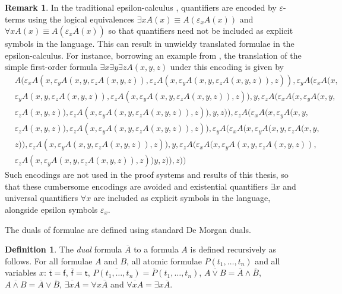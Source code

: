 \documentclass[10pt]{article}
\theoremstyle{definition}\newtheorem{remark}[theorem]{Remark}
\theoremstyle{definition}\newtheorem{example}[theorem]{Example}
\theoremstyle{definition}\newtheorem{definition}[theorem]{Definition}
\newcommand{\trueUnit}{\mathsf{t}}
\newcommand{\falseUnit}{\mathsf{f}}
\begin{document}
	\begin{remark}\label{EpsilonTranslationRemark}
		In the traditional epsilon-calculus \cite{HilbertFoundations, MoserEpsilonCalculus, MoserZachEpsilonCalculusAndHerbrand, BaazLolicEpsilonShorterProofs}, quantifiers are encoded by $\varepsilon$-terms using the logical equivalences $\exists x A(x) \equiv A(\varepsilon_x A(x))$ and $\forall x A(x) \equiv A(\varepsilon_x \overline{A}(x))$ so that quantifiers need not be included as explicit symbols in the language. This can result in unwieldy translated formulae in the epsilon-calculus. For instance, borrowing an example from \cite{BaazEpsilon}, the translation of the simple first-order formula $\exists x \exists y \exists z A(x, y, z)$ under this encoding is given by
		\begin{align*}
			&A(\varepsilon_xA(x, \varepsilon_yA(x, y, \varepsilon_zA(x, y, z)), \varepsilon_zA(x, \varepsilon_yA(x, y, \varepsilon_zA(x, y, z)), z)), \varepsilon_yA(\varepsilon_xA(x, \\
			&\varepsilon_yA(x, y, \varepsilon_zA(x, y, z)), \varepsilon_zA(x, \varepsilon_yA(x, y, \varepsilon_zA(x, y, z)), z)), y, \varepsilon_zA(\varepsilon_xA(x, \varepsilon_yA(x, y, \\
			&\varepsilon_zA(x, y, z)), \varepsilon_zA(x, \varepsilon_yA(x, y, \varepsilon_zA(x, y, z)), z)), y, z)), \varepsilon_zA(\varepsilon_xA(x, \varepsilon_yA(x, y, \\
			&\varepsilon_zA(x, y, z)), \varepsilon_zA(x, \varepsilon_yA(x, y, \varepsilon_zA(x, y, z)), z)), \varepsilon_yA(\varepsilon_xA(x, \varepsilon_yA(x, y, \varepsilon_zA(x, y, \\
			&z)), \varepsilon_zA(x, \varepsilon_yA(x, y, \varepsilon_zA(x, y, z)), z)), y, \varepsilon_zA(\varepsilon_xA(x, \varepsilon_yA(x, y, \varepsilon_zA(x, y, z)), \\
			&\varepsilon_zA(x, \varepsilon_yA(x, y, \varepsilon_zA(x, y, z)), z))y, z)), z))
		\end{align*}
		Such encodings are not used in the proof systems and results of this thesis, so that these cumbersome encodings are avoided and existential quantifiers $\exists x$ and universal quantifiers $\forall x$ are included as explicit symbols in the language, alongside epsilon symbols $\varepsilon_x$.
	\end{remark}
	
	The duals of formulae are defined using standard De Morgan duals.
	
	\begin{definition}
		The \textit{dual} formula $\overline{A}$ to a formula $A$ is defined recursively as follows. For all formulae $A$ and $B$, all atomic formulae $P(t_1, \dots, t_n)$ and all variables $x$:
		$\overline{\trueUnit} = \falseUnit$,
		$\overline{\falseUnit} = \trueUnit$,
		$\overline{P(t_1, \dots, t_n)} = \overline{P}(t_1, \dots, t_n)$,
		$\overline{A \lor B} = \overline{A} \land \overline{B}$,
		$\overline{A \land B} = \overline{A} \lor \overline{B}$, $\overline{\exists x A} = \forall x \overline{A}$ and $\overline{\forall x A} = \exists x \overline{A}$.
	\end{definition}
\end{document}
